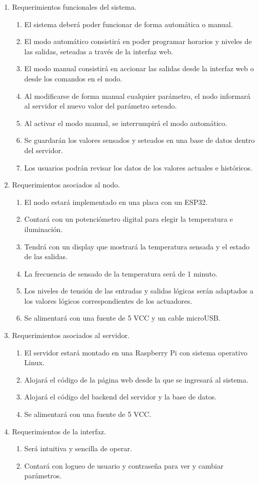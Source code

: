 \documentclass[
11pt, %
]{charter}
\begin{document}
\begin{enumerate}
	\item Requerimientos funcionales del sistema.
		\begin{enumerate}
			\item El sistema deberá poder funcionar de forma automática o manual.		
			\item El modo automático consistirá en poder programar horarios y niveles de las salidas, seteadas a través de la interfaz web.
			\item El modo manual consistirá en accionar las salidas desde la interfaz web o desde los comandos en el nodo.
			\item Al modificarse de forma manual cualquier parámetro, el nodo informará al servidor el nuevo valor del parámetro seteado.
			\item Al activar el modo manual, se interrumpirá el modo automático.
			\item Se guardarán los valores sensados y seteados en una base de datos dentro del servidor.	
			\item Los usuarios podrán revisar los datos de los valores actuales e históricos.
		\end{enumerate}
	\item Requerimientos asociados al nodo.
		\begin{enumerate}
			\item El nodo estará implementado en una placa con un ESP32.			
			\item Contará con un potenciómetro digital para elegir la temperatura e iluminación.
			\item Tendrá con un display que mostrará la temperatura sensada y el estado de las salidas.
			\item La frecuencia de sensado de la temperatura será de 1 minuto.
			\item Los niveles de tensión de las entradas y salidas lógicas serán adaptados a los valores lógicos correspondientes de los actuadores.
			\item Se alimentará con una fuente de 5 VCC y un cable microUSB.
		\end{enumerate}
	\item Requerimientos asociados al servidor.
		\begin{enumerate}
			\item El servidor estará montado en una Raspberry Pi con sistema operativo Linux.
			\item Alojará el código de la página web desde la que se ingresará al sistema.
			\item Alojará el código del backend del servidor y la base de datos.
			\item Se alimentará con una fuente de 5 VCC.
		\end{enumerate}
	\item Requerimientos de la interfaz.
		\begin{enumerate}
			\item Será intuitiva y sencilla de operar.
			\item Contará con logueo de usuario y contraseña para ver y cambiar parámetros.
		\end{enumerate}
\end{enumerate}
\end{document}
